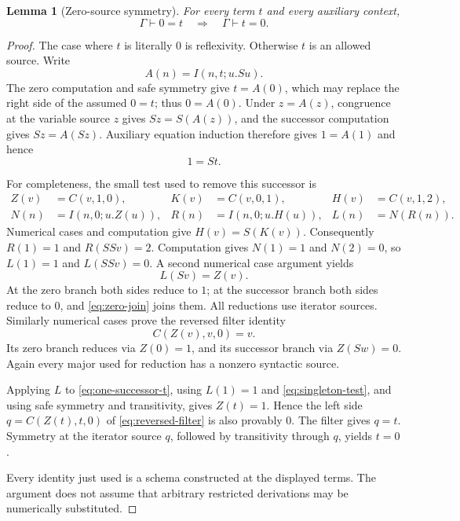 \documentclass[11pt,letterpaper]{article}
\newtheorem{lemma}[theorem]{Lemma}
\theoremstyle{definition}\newtheorem{definition}[theorem]{Definition}
\theoremstyle{remark}\newtheorem{remark}[theorem]{Remark}
\begin{document}
\begin{lemma}[Zero-source symmetry]\label{lem:zero-symmetry}
For every term $t$ and every auxiliary context,
\[
 \Gamma\vdash 0=t\quad\Longrightarrow\quad\Gamma\vdash t=0.
\]
\end{lemma}
\begin{proof}
The case where $t$ is literally $0$ is reflexivity.  Otherwise $t$ is an
allowed source.  Write
\[
 A(n)=I(n,t;u.Su).
\]
The zero computation and safe symmetry give $t=A(0)$, which may replace
the right side of the assumed $0=t$; thus $0=A(0)$.  Under
$z=A(z)$, congruence at the variable source $z$ gives
$Sz=S(A(z))$, and the successor computation gives $Sz=A(Sz)$.
Auxiliary equation induction therefore gives $1=A(1)$ and hence
\begin{equation}
 1=St.
 \label{eq:one-successor-t}
\end{equation}

For completeness, the small test used to remove this successor is
\[
 \begin{aligned}
 Z(v)&=C(v,1,0),& K(v)&=C(v,0,1),& H(v)&=C(v,1,2),\\
 N(n)&=I(n,0;u.Z(u)),& R(n)&=I(n,0;u.H(u)),& L(n)&=N(R(n)).
 \end{aligned}
\]
Numerical cases and computation give $H(v)=S(K(v))$.  Consequently
$R(1)=1$ and $R(SSv)=2$.  Computation gives $N(1)=1$ and $N(2)=0$,
so $L(1)=1$ and $L(SSv)=0$.  A second numerical case argument yields
\begin{equation}
 L(Sv)=Z(v).
 \label{eq:singleton-test}
\end{equation}
At the zero branch both sides reduce to $1$; at the successor branch
both sides reduce to $0$, and \eqref{eq:zero-join} joins them.  All
reductions use iterator sources.  Similarly numerical cases prove the
reversed filter identity
\begin{equation}
 C(Z(v),v,0)=v.
 \label{eq:reversed-filter}
\end{equation}
Its zero branch reduces via $Z(0)=1$, and its successor branch via
$Z(Sw)=0$.  Again every major used for reduction has a nonzero
syntactic source.

Applying $L$ to \eqref{eq:one-successor-t}, using
$L(1)=1$ and \eqref{eq:singleton-test}, and using safe symmetry and
transitivity, gives $Z(t)=1$.  Hence the left side
$q=C(Z(t),t,0)$ of \eqref{eq:reversed-filter} is also provably $0$.
The filter gives $q=t$.  Symmetry at the iterator source $q$, followed
by transitivity through $q$, yields $t=0$.

Every identity just used is a schema constructed at the displayed
terms.  The argument does not assume that arbitrary restricted
derivations may be numerically substituted.
\end{proof}
\end{document}
